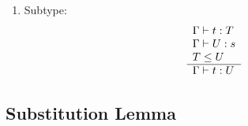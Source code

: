 \begin{definition}
\begin{enumerate}
\begin{enumerate}
            \item Subtype:
                $$
                \begin{array}{l} 
                    \Gamma \vdash t: T
                    \\
                    \Gamma \vdash U: s
                    \\
                    T \le U
                 \\ \hline 
                    \Gamma \vdash t: U
                \end{array}
                $$

        \end{enumerate}
    \end{enumerate}
\end{definition}



\subsection{Substitution Lemma}



